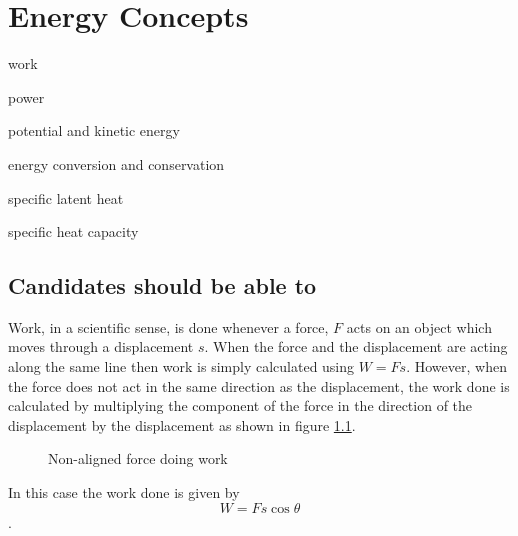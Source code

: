 \documentclass[revision-guide.tex]{subfiles}
\begin{document}
\chapter{Energy Concepts}
\raggedbottom
\begin{content}
    \item work
    \item power
    \item potential and kinetic energy
    \item energy conversion and conservation
    \item specific latent heat
\item specific heat capacity
\end{content}

\section*{Candidates should be able to}


Work, in a scientific sense, is done whenever a force, $F$ acts on an object which moves through a displacement $s$. When the force and the displacement are acting along the same line then work is simply calculated using $W=Fs$. However, when the force does not act in the same direction as the displacement, the work done is calculated by multiplying the component of the force in the direction of the displacement by the displacement as shown in figure \ref{work}.

\begin{figure}[h]
  \begin{center}
  \end{center}
  \caption{Non-aligned force doing work}
  \label{work}
\end{figure}

In this case the work done is given by
 \begin{equation}\label{eq:work}
 W = Fs\cos{\theta}
 \end{equation}.
\end{document}
